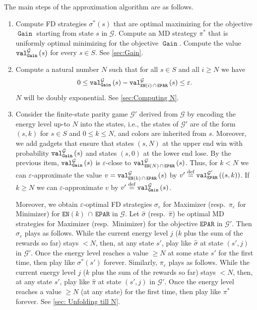 \documentclass[a4paper,UKenglish,cleveref,autoref,thm-restate]{lipics-v2021}
\DeclareMathOperator{\Gain}{\mathtt{Gain}}
\newcommand{\Eparity}{\mathtt{EPAR}}
\newcommand{\en}{\mathtt{EN}}
\newcommand{\+}[1]{\mathbb{#1}}
\newcommand{\?}[1]{\mathcal{#1}}
\newcommand{\eqby}[2][=]{\stackrel{\text{{\tiny{#2}}}}{#1}}
\newcommand{\eqdef}{\eqby{def}}
\newcommand{\eps}{\varepsilon}
\newcommand{\game}{{\mathcal G}}
\newcommand{\states}{S}
\newcommand{\s}{s}
\newcommand{\zstrat}{\sigma}
\newcommand{\ostrat}{\pi}
\newcommand{\optzstrat}{\zstrat^*}
\newcommand{\optostrat}{\ostrat^*}
\begin{document}
The main steps of the approximation algorithm are as follows.
\begin{enumerate}
\item
  Compute FD strategies $\optzstrat(\s)$
  that are optimal maximizing for the objective $\Gain$ starting from state $\s$ in $\game$.
  Compute an MD strategy $\optostrat$
  that is uniformly optimal minimizing 
  for the objective $\Gain$.
  Compute the value $\valueof[\game][\Gain]{\s}$ for every
  $\s \in \states$. 
  See \cref{sec:Gain}. \label{itm:computing gain strategies}
\item
  Compute a natural number $N$ such that for all $\s \in \states$ and
  all $i \ge N$ we have
  \[
    0 \le \valueof[\game][\Gain]{\s} - \valueof[\game][\en(i)\,\cap\,\Eparity]{\s} \le \eps.
  \]
  $N$ will be doubly exponential. See \cref{sec:Computing N}.
  \label{itm:findN}
\item
   Consider the finite-state parity game $\game'$ derived from $\game$ by encoding the energy
   level up-to $N$ into the states, i.e., the states of $\game'$ are of the form $(s,k)$
   for $s\in \states$ and $0 \le k \le N$, and colors are inherited from $\s$.
   Moreover, we add gadgets that ensure that
   states $(\s,N)$ at the upper end win with probability
   $\valueof[\game][\Gain]{\s}$ and states $(\s,0)$ at the lower end lose.
   By the previous item, $\valueof[\game][\Gain]{\s}$ is $\eps$-close to
   $\valueof[\game][\en(N)\,\cap\,\Eparity]{\s}$.
   Thus, for $k < N$ we can $\eps$-approximate the value 
   $v = \valueof[\game][\en(k)\,\cap\,\Eparity]{\s}$ by
   $v' \eqdef \valueof[\game'][\Eparity]{(\s,k)}$.
   If $k \ge N$ we can $\eps$-approximate $v$ 
   by $v' \eqdef \valueof[\game][\Gain]{\s}$.

   Moreover, we obtain $\eps$-optimal FD strategies $\zstrat_\eps$
   for Maximizer (resp.\ $\ostrat_\eps$ for Minimizer) for
   $\en(k)\,\cap\,\Eparity$ in $\game$.
   Let $\hat{\zstrat}$ (resp.\ $\hat{\ostrat}$) be optimal MD strategies
   for Maximizer (resp.\ Minimizer) for the objective $\Eparity$ in $\game'$.
   Then $\zstrat_\eps$ plays as follows.
   While the current energy level $j$ ($k$ plus the sum of the rewards so far)
   stays $<N$, then, at any state $\s'$, play like $\hat{\zstrat}$ at state
   $(\s',j)$ in $\game'$.
   Once the energy level reaches a value $\ge N$ at some state $\s'$
   for the first time, then play like $\optzstrat(s')$ forever. 
   Similarly, $\ostrat_\eps$ plays as follows.
   While the current energy level $j$ ($k$ plus the sum of the rewards so far)
   stays $<N$, then, at any state $\s'$, play like $\hat{\ostrat}$ at state
   $(\s',j)$ in $\game'$.
   Once the energy level reaches a value $\ge N$ (at any state)
   for the first time, then play like $\optostrat$ forever.
   See \cref{sec: Unfolding till N}.\label{itm:Unfolding}
\end{enumerate}
\end{document}
